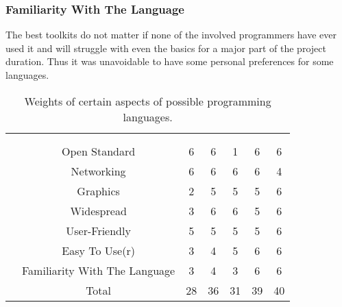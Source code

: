\subsubsection*{Familiarity With The Language} The best toolkits do not matter if none of the involved programmers have ever used it and will struggle with even the basics for a major part of the project duration. Thus it was unavoidable to have some personal preferences for some languages.

\begin{table}
\begin{centering}
\setlength{\extrarowheight}{2pt}
\begin{tabular}{*{7}{c|}}
    \multicolumn{2}{c}{}        & \multicolumn{2}{c}{}\\\cline{3-7}
    \multicolumn{1}{c}{}    &   & \parbox[t]{2mm}{}%
                                & \parbox[t]{2mm}{}%
                                & \parbox[t]{2mm}{}%
                                & \parbox[t]{2mm}{}%
                                & \parbox[t]{2mm}{} \\
                & Open Standard & 6 & 6 & 1 & 6 & 6\\
                   & Networking & 6 & 6 & 6 & 6 & 4\\
                     & Graphics & 2 & 5 & 5 & 5 & 6\\
                   & Widespread & 3 & 6 & 6 & 5 & 6\\
                & User-Friendly & 5 & 5 & 5 & 5 & 6\\
               & Easy To Use(r) & 3 & 4 & 5 & 6 & 6\\
& Familiarity With The Language & 3 & 4 & 3 & 6 & 6\\
                       & Total &28 &36 &31 &39 & 40\\
\end{tabular}
\caption{Weights of certain aspects of possible programming languages.}
\label{fig:gui_language_choices}
\end{centering}
\end{table}

